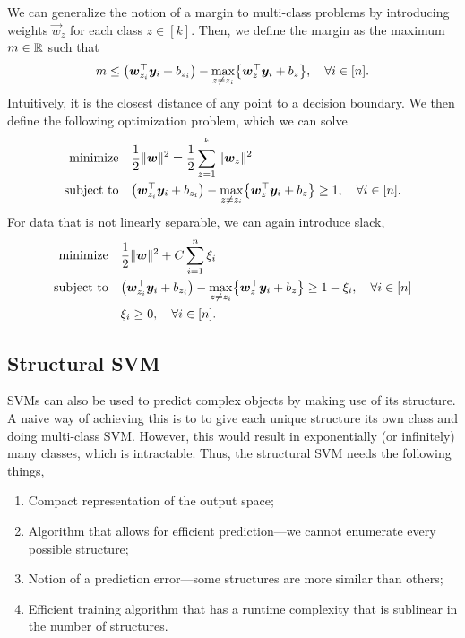 We can generalize the notion of a margin to multi-class problems by introducing weights $\vec{w}_z$
for each class $z \in [k]$. Then, we define the margin as the maximum $m \in \mathbb{R}$ such that \[
    m \leq \lft( \transpose{\vec{w}}_{z_i} \vec{y}_i + b_{z_i} \rgt) - \max_{z \neq z_i} \lft\{ \transpose{\vec{w}_z} \vec{y}_i + b_z \rgt\}, \quad \forall i \in [n].
\]
Intuitively, it is the closest distance of any point to a decision boundary. We then define the
following optimization problem, which we can solve
\begin{align*}
    \text{minimize}   & \quad \frac{1}{2} \| \vec{w} \|^2 = \frac{1}{2} \sum_{z=1}^{^k} \| \vec{w}_z \|^2                                                                                        \\
    \text{subject to} & \quad \lft( \transpose{\vec{w}_{z_i}} \vec{y}_i + b_{z_i} \rgt) - \max_{z \neq z_i} \lft\{ \transpose{\vec{w}_z} \vec{y}_i + b_z \rgt\} \geq 1, \quad \forall i \in [n].
\end{align*}
For data that is not linearly separable, we can again introduce slack,
\begin{align*}
    \text{minimize}   & \quad \frac{1}{2} \| \vec{w} \|^2 + C \sum_{i=1}^{n} \xi_i                                                                                                                      \\
    \text{subject to} & \quad \lft( \transpose{\vec{w}_{z_i}} \vec{y}_i + b_{z_i} \rgt) - \max_{z \neq z_i} \lft\{ \transpose{\vec{w}_z} \vec{y}_i + b_z \rgt\} \geq 1 - \xi_i, \quad \forall i \in [n] \\
                      & \quad \xi_i \geq 0, \quad \forall i \in [n].
\end{align*}

\subsection{Structural SVM}

SVMs can also be used to predict complex objects by making use of its structure. A naive way of
achieving this is to to give each unique structure its own class and doing multi-class SVM.
However, this would result in exponentially (or infinitely) many classes, which is intractable.
Thus, the structural SVM needs the following things,
\begin{enumerate}
    \item Compact representation of the output space;
    \item Algorithm that allows for efficient prediction---we cannot enumerate every possible structure;
    \item Notion of a prediction error---some structures are more similar than others;
    \item Efficient training algorithm that has a runtime complexity that is sublinear in the number of
          structures.
\end{enumerate}

